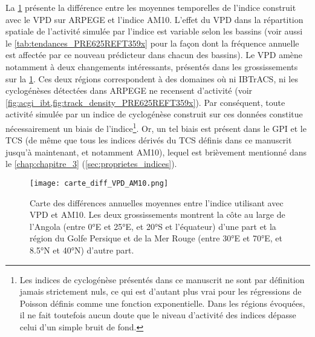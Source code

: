 \documentclass[../main.tex]{subfiles}
\begin{document}
La \cref{fig:diff_VPD_AM10} présente la différence entre les moyennes temporelles de l'indice construit avec le VPD sur ARPEGE et l'indice AM10. L'effet du VPD
dans la répartition spatiale de l'activité simulée par l'indice est variable selon les bassins (voir aussi le \cref{tab:tendances_PRE625REFT359x} pour la façon
dont la fréquence annuelle est affectée par ce nouveau prédicteur dans chacun des bassins). Le VPD amène notamment à deux changements intéressants, présentés
dans les grossissements sur la \cref{fig:diff_VPD_AM10}. Ces deux régions correspondent à des domaines où ni IBTrACS, ni les cyclogénèses détectées dans ARPEGE
ne recensent d'activité (voir \cref{fig:acgi_ibt,fig:track_density_PRE625REFT359x}). Par conséquent, toute activité simulée par un indice de cyclogénèse
construit sur ces données constitue nécessairement un biais de l'indice\footnote{Les indices de cyclogénèse présentés dans ce manuscrit ne sont par définition
    jamais strictement nuls, ce qui est d'autant plus vrai pour les régressions de Poisson définis comme une fonction exponentielle. Dans les régions évoquées,
    il ne fait toutefois aucun doute que le niveau d'activité des indices dépasse celui d'un simple bruit de fond.}. Or, un tel biais est présent dans le GPI et
    le TCS (de même que tous les indices dérivés du TCS définis dans ce manuscrit jusqu'à maintenant, et notamment AM10), lequel est brièvement mentionné dans
    le \cref{chap:chapitre_3} (\cref{sec:proprietes_indices}).

\begin{figure}[tb]
    \centering
    \texttt{[image: carte\_diff\_VPD\_AM10.png]}
    \caption{Carte des différences annuelles moyennes entre l'indice utilisant avec VPD et AM10. Les deux grossissements montrent la côte au large de l'Angola
    (entre \ang{0}E et \ang{25}E, et \ang{20}S et l'équateur) d'une part et la région du Golfe Persique et de la Mer Rouge (entre \ang{30}E et \ang{70}E, et
    \ang{8.5}N et \ang{40}N) d'autre part.}
    \label{fig:diff_VPD_AM10}
\end{figure}
\end{document}
